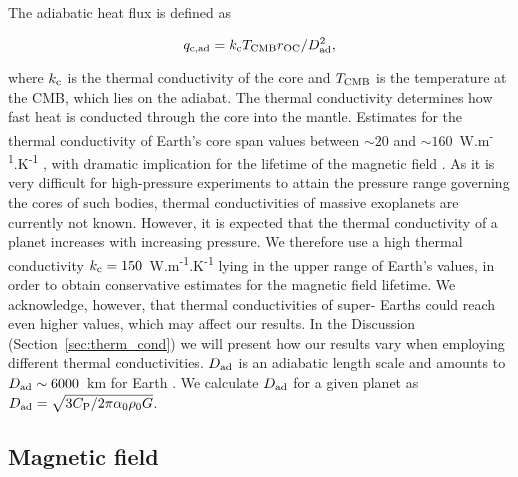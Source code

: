 \documentclass[draft]{agujournal2019} %
\begin{document}
The adiabatic heat flux is defined as
\begin{linenomath*}
\begin{equation}
\label{eq:ad_flux}
    q_{\rm c, a d}=k_{\rm c} T_{\rm CMB} r_{\rm OC} / D_{\rm ad}^{2},
\end{equation}
\end{linenomath*}
where $k_{\rm c}$ is the thermal conductivity of the core and $T_{\rm CMB}$ is the temperature at the CMB, which lies on the adiabat. The thermal conductivity determines how fast heat is conducted through the core into the mantle. Estimates for the thermal conductivity of Earth's core span values between $\sim 20$ \cite{konopkova2016direct} and $\sim 160$~W.m\textsuperscript{-1}.K\textsuperscript{-1} \cite{gomi2013high}, with dramatic implication for the lifetime of the magnetic field \cite{labrosse_thermal_2015}. As it is very difficult for high-pressure experiments to attain the pressure range governing the cores of such bodies, thermal conductivities of massive exoplanets are currently not known. However, it is expected that the thermal conductivity of a planet increases with increasing pressure. We therefore use a high thermal conductivity $k_{\rm c}=150$~W.m\textsuperscript{-1}.K\textsuperscript{-1} lying in the upper range of Earth's values, in order to obtain conservative estimates for the magnetic field lifetime. We acknowledge, however, that thermal conductivities of super- Earths could reach even higher values, which may affect our results. In the Discussion (Section~\ref{sec:therm_cond}) we will present how our results vary when employing different thermal conductivities. $D_{\rm ad}$ is an adiabatic length scale \cite{labrosse2001age} and amounts to $D_{\rm ad}\sim 6000$~km for Earth \cite{labrosse_thermal_2003}. We calculate $D_{\rm ad}$ for a given planet as $D_{\rm ad}=\sqrt{3 C_{\rm P} / 2 \pi \alpha_{\rm 0} \rho_{\mathrm{0}} G}$. 

\subsection{Magnetic field}\label{sec:methods_MF}
\end{document}
